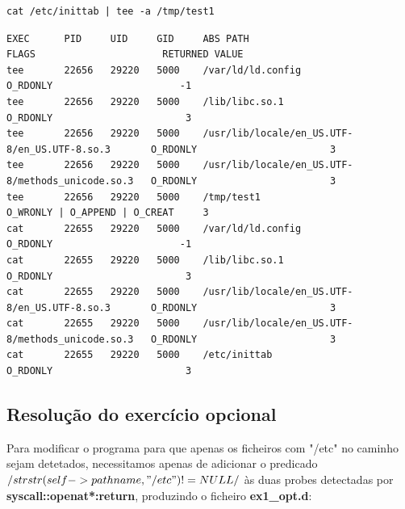 \documentclass[a4paper]{article}
\begin{document}
 \begin{lstlisting}[style=command]
cat /etc/inittab | tee -a /tmp/test1
   \end{lstlisting}
\par 
\begin{lstlisting}[style=esc]
EXEC      PID     UID     GID     ABS PATH                                          FLAGS                      RETURNED VALUE
tee       22656   29220   5000    /var/ld/ld.config                                  O_RDONLY                      -1
tee       22656   29220   5000    /lib/libc.so.1                                     O_RDONLY                       3
tee       22656   29220   5000    /usr/lib/locale/en_US.UTF-8/en_US.UTF-8.so.3       O_RDONLY                       3
tee       22656   29220   5000    /usr/lib/locale/en_US.UTF-8/methods_unicode.so.3   O_RDONLY                       3
tee       22656   29220   5000    /tmp/test1                                         O_WRONLY | O_APPEND | O_CREAT     3
cat       22655   29220   5000    /var/ld/ld.config                                  O_RDONLY                      -1
cat       22655   29220   5000    /lib/libc.so.1                                     O_RDONLY                       3
cat       22655   29220   5000    /usr/lib/locale/en_US.UTF-8/en_US.UTF-8.so.3       O_RDONLY                       3
cat       22655   29220   5000    /usr/lib/locale/en_US.UTF-8/methods_unicode.so.3   O_RDONLY                       3
cat       22655   29220   5000    /etc/inittab                                       O_RDONLY                       3
 \end{lstlisting}

\subsection{Resolução do exercício opcional}
Para modificar o programa para que apenas os ficheiros com "/etc" no caminho sejam detetados, necessitamos apenas de adicionar o predicado \textbf{$/strstr(self->pathname,"/etc") != NULL/$} às duas probes detectadas por \textbf{syscall::openat*:return}, produzindo o ficheiro \textbf{ex1\_opt.d}:
\end{document}
